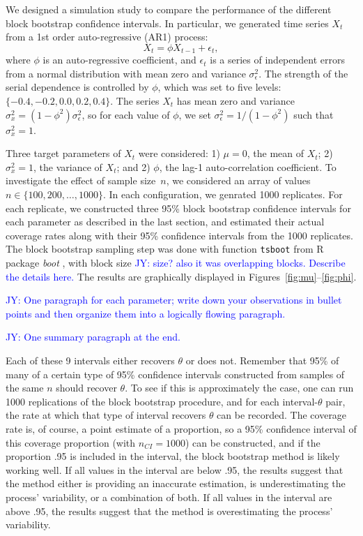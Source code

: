 \documentclass[12pt, letterpaper, titlepage]{article}
\newcommand{\jy}[1]{\textcolor{blue}{JY: #1}}
\begin{document}
We designed a simulation study to compare the performance of the different block
bootstrap confidence intervals. In particular, we generated time series $X_t$
from a 1st order auto-regressive (AR1) process:
\[
X_t = \phi X_{t-1} + \epsilon_t,
\]
where $\phi$ is an auto-regressive coefficient, and $\epsilon_t$ is a series of
independent errors from a normal distribution with mean zero and variance
$\sigma_{\epsilon}^2$. The strength of the serial dependence is controlled by
$\phi$, which was set to five levels: $\{-0.4, -0.2, 0.0, 0.2, 0.4\}$.
The series $X_t$ has mean zero and variance
$\sigma_x^2 = (1 - \phi^2) \sigma_{\epsilon}^2$, so for each value of $\phi$, we
set $\sigma_{\epsilon}^2 = 1 / (1 - \phi^2)$ such that $\sigma_x^2 = 1$.


Three target parameters of $X_t$ were considered:
1) $\mu = 0$, the mean of $X_t$;
2) $\sigma_x^2 = 1$, the variance of $X_t$; and
2) $\phi$, the lag-1 auto-correlation coefficient.
To investigate the effect of sample size~$n$, we considered an array of values
$n \in \{100, 200, \ldots, 1000\}$. In each configuration, we genrated 1000
replicates. For each replicate, we constructed three 95\% block bootstrap
confidence intervals for each parameter as described in the last section, and
estimated their actual coverage rates along with their 95\% confidence
intervals from the 1000 replicates. The block bootstrap sampling step was done
with function \texttt{tsboot} from R package \textsl{boot} \citep{boot}, with
block size \jy{size? also it was overlapping blocks. Describe the details here.}
The results are graphically displayed in Figures~\ref{fig:mu}--\ref{fig:phi}.



\jy{One paragraph for each parameter; write down your observations in bullet
  points and then organize them into a logically flowing paragraph.}

\jy{One summary paragraph at the end.}


Each of these 9 intervals either recovers $\theta$ or does not. Remember that
95\% of many of a certain type of 95\% confidence intervals constructed from
samples of the same $n$ should recover $\theta$. To see if this is
approximately the case, one can run 1000 replications of the block bootstrap
procedure, and for each interval-$\theta$ pair, the rate at which that type of
interval recovers $\theta$ can be recorded. The coverage rate is, of course, a
point estimate of a proportion, so a 95\% confidence interval of this coverage
proportion (with $n_{CI} = 1000$) can be constructed, and if the proportion
.95 is included in the interval, the block bootstrap method is likely working
well. If all values in the interval are below .95, the results suggest that the
method either is providing an inaccurate estimation, is underestimating the
process' variability, or a combination of both. If all values in the interval
are above .95, the results suggest that the method is overestimating the
process' variability.
\end{document}
